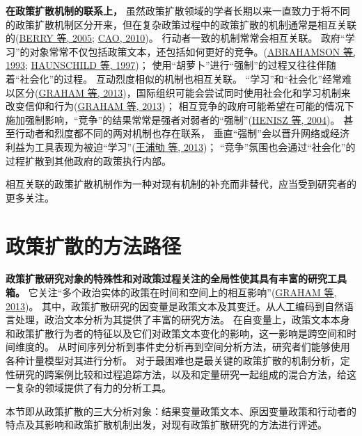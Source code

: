 \documentclass[
  12pt,
]{ctexart}
\begin{document}
\textbf{在政策扩散机制的联系上，}
虽然政策扩散领域的学者长期以来一直致力于将不同的政策扩散机制区分开来，但在复杂政策过程中的政策扩散的机制通常是相互关联的(\protect\hyperlink{ref-BerryBaybeck2005}{BERRY 等, 2005}; \protect\hyperlink{ref-Cao2010}{CAO, 2010})。
行动者一致的机制常常会相互关联。
政府``学习''的对象常常不仅包括政策文本，还包括如何更好的竞争。(\protect\hyperlink{ref-AbrahamsonRosenkopf1993}{ABRAHAMSON 等, 1993}; \protect\hyperlink{ref-HaunschildMiner1997}{HAUNSCHILD 等, 1997})；
使用``胡萝卜''进行``强制''的过程又往往伴随着``社会化''的过程。
互动烈度相似的机制也相互关联。
``学习''和``社会化''经常难以区分(\protect\hyperlink{ref-GrahamEtAl2013}{GRAHAM 等, 2013})，国际组织可能会尝试同时使用社会化和学习机制来改变信仰和行为(\protect\hyperlink{ref-GrahamEtAl2013}{GRAHAM 等, 2013})；
相互竞争的政府可能希望在可能的情况下施加强制影响，``竞争''的结果常常是强者对弱者的``强制''(\protect\hyperlink{ref-HeniszEtAl2004}{HENISZ 等, 2004})。
甚至行动者和烈度都不同的两对机制也存在联系，
垂直``强制''会以晋升网络或经济利益为工具表现为被迫``学习''(\protect\hyperlink{ref-WangPuQuLaiXianJin2013}{王浦劬 等, 2013})；
``竞争''氛围也会通过``社会化''的过程扩散到其他政府的政策执行内部。

相互关联的政策扩散机制作为一种对现有机制的补充而非替代，应当受到研究者的更多关注。

\newpage

\hypertarget{ux653fux7b56ux6269ux6563ux7684ux65b9ux6cd5ux8defux5f84}{%
\section{政策扩散的方法路径}\label{ux653fux7b56ux6269ux6563ux7684ux65b9ux6cd5ux8defux5f84}}

\textbf{政策扩散研究对象的特殊性和对政策过程关注的全局性使其具有丰富的研究工具箱。}
它关注``多个政治实体的政策在时间和空间上的相互影响''(\protect\hyperlink{ref-GrahamEtAl2013}{GRAHAM 等, 2013})。
其中，政策扩散研究的因变量是政策文本及其变迁。从人工编码到自然语言处理，政治文本分析为其提供了丰富的研究方法。
在自变量上，政策文本本身和政策扩散行为者的特征以及它们对政策文本变化的影响，这一影响是跨空间和时间维度的。
从时间序列分析到事件史分析再到空间分析方法，研究者们能够使用各种计量模型对其进行分析。
对于最困难也是最关键的政策扩散的机制分析，定性研究的跨案例比较和过程追踪方法，以及和定量研究一起组成的混合方法，给这一复杂的领域提供了有力的分析工具。

本节即从政策扩散的三大分析对象：结果变量政策文本、原因变量政策和行动者的特点及其影响和政策扩散机制出发，对现有政策扩散研究的方法进行评述。
\end{document}
